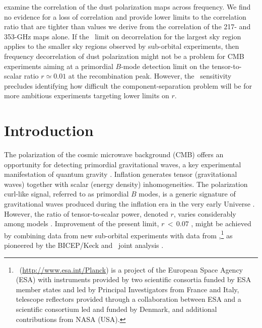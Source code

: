 \documentclass[longauth,traditabstract]{aa}
\begin{document}
{examine the correlation of the dust polarization maps across frequency.  We find no evidence for a loss of correlation and provide lower limits to the correlation ratio that are tighter than values we 
derive from the correlation of the 217- and 353-GHz maps alone. 
If the \Planck\ limit on decorrelation for the largest sky region applies to the smaller sky regions observed by sub-orbital experiments, 
then frequency decorrelation of dust polarization might not be a problem for CMB experiments aiming at a primordial $B$-mode detection limit on the tensor-to-scalar ratio $r\simeq0.01$ at the recombination peak.
However, the \Planck\ sensitivity precludes identifying how difficult the component-separation problem will be
for more ambitious experiments targeting lower limits on $r$.
}
 
\date{Received 11 January 2018 / Accepted 14 September 2018}

\maketitle

\section{Introduction}

The polarization of the cosmic microwave background (CMB)
offers an opportunity for detecting primordial
gravitational waves, a key experimental manifestation of quantum gravity \citep{Starobinsky79}. 
%
Inflation generates tensor (gravitational waves) together with scalar (energy density) inhomogeneities. 
%
The polarization curl-like signal, referred to as primordial $B$ modes,
is a generic signature of gravitational waves produced during the inflation era in the very early Universe \citep{Guth81,Linde82}.
However, the ratio of tensor-to-scalar power, denoted $r$, varies considerably among models \citep{Baumann09}. 
Improvement of
the present limit, $r\,{<}\,0.07$ \citep[95\,\% confidence,][]{PhysRevLett.116.031302},
might be achieved by combining data from new sub-orbital experiments with data from \Planck,\footnote{\Planck\ (\url{http://www.esa.int/Planck}) is a project of
the European Space Agency (ESA) with instruments provided by two scientific
consortia funded by ESA member states and led by Principal Investigators from
France and Italy, telescope reflectors provided through a collaboration between
ESA and a scientific consortium led and funded by Denmark, and additional
contributions from NASA (USA).} as pioneered by the BICEP/Keck and \Planck\ joint analysis \citep{pb2015}.
%
\end{document}
